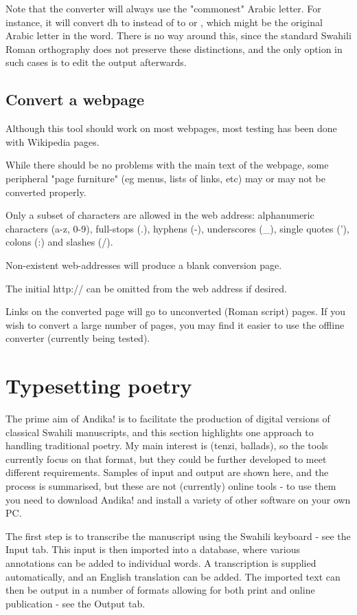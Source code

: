 \documentclass[a4paper,10pt, oneside]{book}
\newcommand\AS[1]{{\citationfont\RLE{#1}}}
\begin{document}
Note that the converter will always use the "commonest" Arabic letter. For instance, it will convert dh to \AS{ذ} instead of to \AS{ض} or \AS{ظ}, which might be the original Arabic letter in the word. There is no way around this, since the standard Swahili Roman orthography does not preserve these distinctions, and the only option in such cases is to edit the output afterwards.

\section{Convert a webpage}

Although this tool should work on most webpages, most testing has been done with Wikipedia pages.

While there should be no problems with the main text of the webpage, some peripheral "page furniture" (eg menus, lists of links, etc) may or may not be converted properly.

Only a subset of characters are allowed in the web address: alphanumeric characters (a-z, 0-9), full-stops (.), hyphens (-), underscores (\_), single quotes ('), colons (:) and slashes (/).

Non-existent web-addresses will produce a blank conversion page.

The initial http:// can be omitted from the web address if desired.

Links on the converted page will go to unconverted (Roman script) pages. If you wish to convert a large number of pages, you may find it easier to use the offline converter (currently being tested).


\chapter{Typesetting poetry}
\label{ch:poetry}

The prime aim of Andika! is to facilitate the production of digital versions of classical Swahili manuscripts, and this section highlights one approach to handling traditional poetry. My main interest is \AS{تٖينْزِ} (tenzi, ballads), so the tools currently focus on that format, but they could be further developed to meet different requirements. Samples of input and output are shown here, and the process is summarised, but these are not (currently) online tools - to use them you need to download Andika! and install a variety of other software on your own PC.

The first step is to transcribe the manuscript using the Swahili keyboard - see the Input tab. This input is then imported into a database, where various annotations can be added to individual words. A transcription is supplied automatically, and an English translation can be added. The imported text can then be output in a number of formats allowing for both print and online publication - see the Output tab.
\end{document}
